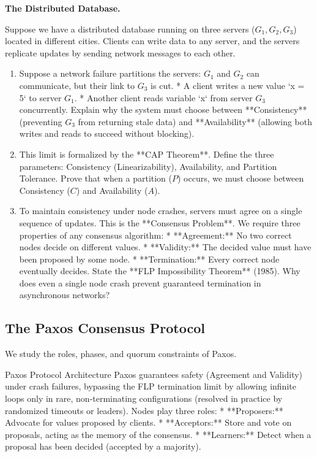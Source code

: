 \documentclass[12pt, a4paper]{book}
\begin{document}
\begin{puzzlebox}
\textbf{The Distributed Database.}

Suppose we have a distributed database running on three servers ($G_1, G_2, G_3$) located in different cities.
Clients can write data to any server, and the servers replicate updates by sending network messages to each other.
\begin{enumerate}[label=(\alph*), leftmargin=*]
  \item Suppose a network failure partitions the servers: $G_1$ and $G_2$ can communicate, but their link to $G_3$ is cut.
        * A client writes a new value `x = 5` to server $G_1$.
        * Another client reads variable `x` from server $G_3$ concurrently.
        Explain why the system must choose between **Consistency** (preventing $G_3$ from returning stale data) and **Availability** (allowing both writes and reads to succeed without blocking).
  \item This limit is formalized by the **CAP Theorem**.
        Define the three parameters: Consistency (Linearizability), Availability, and Partition Tolerance.
        Prove that when a partition ($P$) occurs, we must choose between Consistency ($C$) and Availability ($A$).
  \item To maintain consistency under node crashes, servers must agree on a single sequence of updates. This is the **Consensus Problem**.
        We require three properties of any consensus algorithm:
        * **Agreement:** No two correct nodes decide on different values.
        * **Validity:** The decided value must have been proposed by some node.
        * **Termination:** Every correct node eventually decides.
        State the **FLP Impossibility Theorem** (1985). Why does even a single node crash prevent guaranteed termination in asynchronous networks?
\end{enumerate}
\end{puzzlebox}

\subsection{The Paxos Consensus Protocol}

We study the roles, phases, and quorum constraints of Paxos.

\begin{namedconcept}{Paxos Protocol Architecture}
Paxos guarantees safety (Agreement and Validity) under crash failures, bypassing the FLP termination limit by allowing infinite loops only in rare, non-terminating configurations (resolved in practice by randomized timeouts or leaders).
Nodes play three roles:
* **Proposers:** Advocate for values proposed by clients.
* **Acceptors:** Store and vote on proposals, acting as the memory of the consensus.
* **Learners:** Detect when a proposal has been decided (accepted by a majority).
\end{namedconcept}
\end{document}
